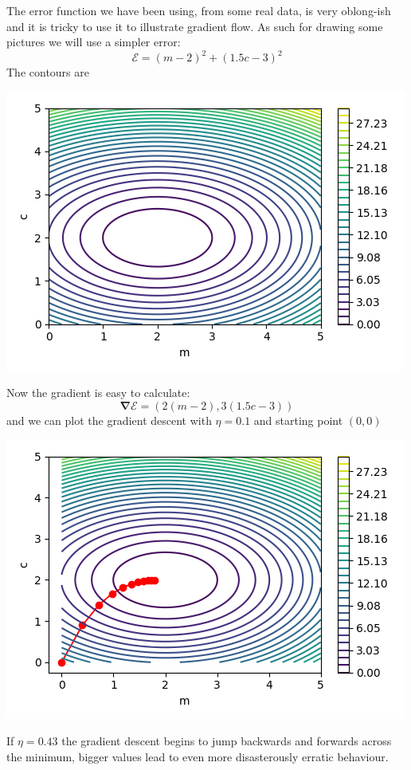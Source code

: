\documentclass[12pt]{article}
\begin{document}
The error function we have been using, from some real data, is very oblong-ish and it is tricky to use it to illustrate gradient flow. As such for drawing some pictures we will use a simpler error:
\begin{equation}
  \mathcal{E}=(m-2)^2+(1.5c-3)^2
\end{equation}
The contours are
\begin{center}
  \includegraphics[]{02.3_simple_contour.png}
  \end{center}
Now the gradient is easy to calculate:
\begin{equation}
  \boldsymbol{\nabla} \mathcal{E}=\left(2(m-2),3(1.5c-3)\right)
\end{equation}
and we can plot the gradient descent with $\eta=0.1$ and starting point $(0,0)$
\begin{center}
  \includegraphics[]{02.3_gradient.png}
  \end{center}
If $\eta=0.43$ the gradient descent begins to jump backwards and
forwards across the minimum, bigger values lead to even more
disasterously erratic behaviour.
\end{document}
